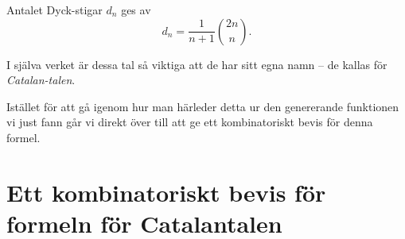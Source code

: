 \documentclass[nobib]{tufte-handout}
\begin{document}
\begin{theorem}\label{theorem_dyck_paths_counted_by_catalan}
    Antalet Dyck-stigar $d_n$ ges av
    $$d_n = \frac{1}{n + 1}\binom{2n}{n}.$$

    I själva verket är dessa tal så viktiga att de har sitt egna namn -- de kallas för \emph{Catalan-talen}.
\end{theorem}

Istället för att gå igenom hur man härleder detta ur den genererande funktionen vi just fann går vi direkt över till att ge ett kombinatoriskt bevis för denna formel.

\section{Ett kombinatoriskt bevis för formeln för Catalantalen}
\end{document}
